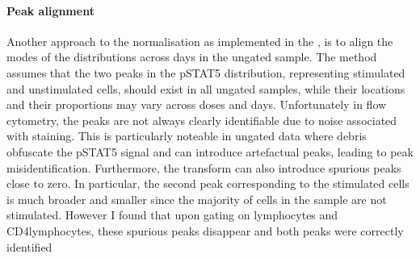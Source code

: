 \paragraph{Peak alignment}
Another approach to the normalisation as implemented in the , is to align the modes
of the distributions across days in the ungated sample.
The method assumes that the two peaks in the pSTAT5 distribution,
representing stimulated and unstimulated cells,
should exist in all ungated samples, while their locations and their proportions may vary across doses and days.
Unfortunately in flow cytometry, the peaks are not always clearly identifiable due to noise associated with staining.
This is particularly noteable in ungated data where debris obfuscate the pSTAT5 signal and can introduce artefactual peaks, leading to peak misidentification.
Furthermore, the transform can also introduce spurious peaks close to zero.
In particular, the second peak corresponding to the stimulated cells is much broader and smaller since the majority of cells in the sample are not stimulated.
However I found that upon gating on lymphocytes and CD4\positive lymphocytes, these spurious peaks disappear and both peaks were correctly identified 
